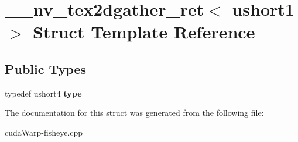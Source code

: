 \hypertarget{struct____nv__tex2dgather__ret_3_01ushort1_01_4}{}\section{\+\_\+\+\_\+nv\+\_\+tex2dgather\+\_\+ret$<$ ushort1 $>$ Struct Template Reference}
\label{struct____nv__tex2dgather__ret_3_01ushort1_01_4}
\subsection*{Public Types}
\begin{DoxyCompactItemize}
\item 
typedef ushort4 {\bfseries type}\hypertarget{struct____nv__tex2dgather__ret_3_01ushort1_01_4_af96124649887edcb5f291b683da15404}{}\label{struct____nv__tex2dgather__ret_3_01ushort1_01_4_af96124649887edcb5f291b683da15404}

\end{DoxyCompactItemize}


The documentation for this struct was generated from the following file\+:\begin{DoxyCompactItemize}
\item 
cuda\+Warp-\/fisheye.\+cpp\end{DoxyCompactItemize}
